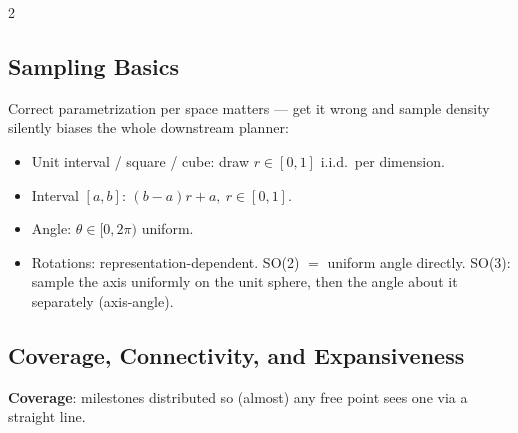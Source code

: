 \documentclass[10pt,a4paper]{article}
\newcommand{\keyterm}[1]{\textbf{#1}}
\begin{document}
\begin{multicols}{2}
\subsection{Sampling Basics}
Correct parametrization per space matters — get it wrong and sample density silently biases the whole downstream planner:
\begin{itemize}
\item Unit interval / square / cube: draw $r\in[0,1]$ i.i.d.\ per dimension.
\item Interval $[a,b]$: $(b-a)r+a,\ r\in[0,1]$.
\item Angle: $\theta\in[0,2\pi)$ uniform.
\item Rotations: representation-dependent. SO(2) $=$ uniform angle directly. SO(3): sample the axis uniformly on the unit sphere, then the angle about it separately (axis-angle).
\end{itemize}

\subsection{Coverage, Connectivity, and Expansiveness}
\keyterm{Coverage}: milestones distributed so (almost) any free point sees one via a straight line.


\end{multicols}
\end{document}
